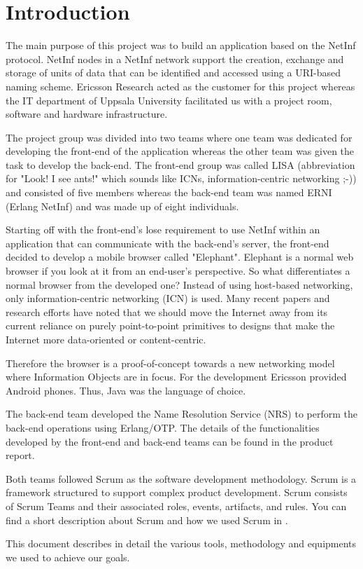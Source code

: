 \section{Introduction}
The main purpose of this project was to build an application based on the NetInf protocol. NetInf nodes in a NetInf network support the creation, exchange and storage of units of data that can be identified and accessed using a URI-based naming scheme. \cite{netinfproto} Ericsson Research acted as the customer for this project whereas the IT department of Uppsala University facilitated us with a project room, software and hardware infrastructure. 

The project group was divided into two teams where one team was dedicated for developing the front-end of the 
application whereas the other team was given the task to develop the back-end. The front-end group was called 
LISA (abbreviation for "Look! I see ants!" which sounds like ICNs, information-centric networking ;-)) and consisted of five members whereas 
the back-end team was named ERNI (Erlang NetInf) and was made up of eight individuals. 

Starting off with the front-end's lose requirement to use NetInf within an application that can communicate with
the back-end's server, the front-end decided to develop a mobile browser called "Elephant". Elephant is a normal
web browser if you look at it from an end-user's perspective. So what differentiates a normal browser
from the developed one? Instead of using host-based networking, only information-centric networking (ICN) is used. Many recent papers and research efforts have noted that we should move the Internet away from its current reliance on purely point-to-point primitives to designs that make the Internet more data-oriented or content-centric. \cite{ghodsietal}  

Therefore the browser is a proof-of-concept towards a new networking model where Information Objects are in focus.
For the development Ericsson provided Android phones. Thus, Java was the language of choice.

The back-end team developed the Name Resolution Service (NRS) to perform the back-end operations using Erlang/OTP. The details of the functionalities developed 
by the front-end and back-end teams can be found in the product report. 

Both teams followed Scrum as the software development methodology. Scrum is a framework structured to support complex product development. Scrum consists of
Scrum Teams and their associated roles, events, artifacts, and rules. \cite{scrumpaper}
You can find a short description about Scrum and
how we used Scrum in .

This document describes in detail the various tools, methodology and equipments we used to achieve our goals. 
